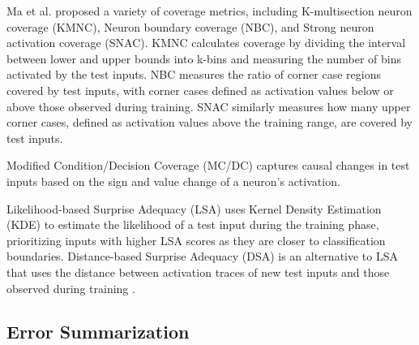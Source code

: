 Ma et al. \cite{Ma} proposed a variety of coverage metrics, including K-multisection neuron coverage (KMNC), Neuron boundary coverage (NBC), and Strong neuron activation coverage (SNAC). KMNC calculates coverage by dividing the interval between lower and upper bounds into k-bins and measuring the number of bins activated by the test inputs. NBC measures the ratio of corner case regions covered by test inputs, with corner cases defined as activation values below or above those observed during training. SNAC similarly measures how many upper corner cases, defined as activation values above the training range, are covered by test inputs.

Modified Condition/Decision Coverage (MC/DC) \cite{SunY} captures causal changes in test inputs based on the sign and value change of a neuron's activation.

Likelihood-based Surprise Adequacy (LSA) uses Kernel Density Estimation (KDE) to estimate the likelihood of a test input during the training phase, prioritizing inputs with higher LSA scores as they are closer to classification boundaries. Distance-based Surprise Adequacy (DSA) is an alternative to LSA that uses the distance between activation traces of new test inputs and those observed during training \cite{Kim}.

\subsection{Error Summarization}

